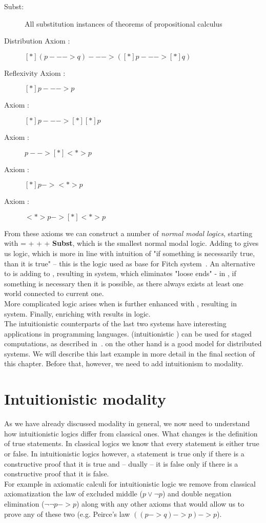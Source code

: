 \begin{description}
\item[Subst:]All substitution instances of theorems of propositional calculus
\item[Distribution Axiom \axiomK{}:] $[*](p --->q) ---> ([*]p ---> [*]q)$
\item[Reflexivity Axiom \axiomT{}:] $[*]p ---> p$
\item[Axiom \axiomSfour{}:] $[*]p ---> [*][*]p$
\item[Axiom \axiomB{}:] $p --> [*]<*>p$
\item[Axiom \axiomD{}:] $[*]p -> <*>p$
\item[Axiom \axiomSfive{}:] $<*>p -> [*]<*>p$
\end{description}

From these axioms we can construct a number of \emph{normal modal logics}, starting with \logicK{} = \axiomK{} +  +  + \textbf{Subst}, which is the smallest normal modal logic. Adding \axiomT{} to \logicK{} gives us \logicT{} logic, which is more in line with intuition of "if something is necessarily true, than it is true" -- this is the logic used as base for Fitch system~\cite{fitch52}. An alternative to \logicT{} is adding \axiomD{} to \logicK{}, resulting in \logicD{} system, which eliminates "loose ends" - in \logicD{}, if something is necessary then it is possible, as there always exists at least one world connected to current one.\\
More complicated logic arises when \logicT{} is further enhanced with \axiomSfour{}, resulting in \logicSfour{} system. Finally, enriching \logicSfour{} with \axiomSfive{} results in \logicSfive{} logic.\\

The intuitionistic counterparts of the last two systems have interesting applications in programming languages. \logiciSfour{} (intuitionistic \logicSfour{}) can be used for staged computations, as described in~\cite{stagedcomp}. \logiciSfive{} on the other hand is a good model for distributed systems. We will describe this last example in more detail in the final section of this chapter. Before that, however, we need to add intuitionism to modality.


\section{Intuitionistic modality}
As we have already discussed modality in general, we now need to understand how intuitionistic logics differ from classical ones. What changes is the definition of true statements. In classical logics we know that every statement is either true or false. In intuitionistic logics however, a statement is true only if there is a constructive proof that it is true and -- dually -- it is false only if there is a constructive proof that it is false.\\
For example in axiomatic calculi for intuitionistic logic we remove from classical axiomatization the law of excluded middle ($p \vee \neg p$) and double negation elimination ($\neg \neg p -> p$) along with any other axioms that would allow us to prove any of these two (e.g. Peirce's law $((p-> q) -> p) -> p$). \\


